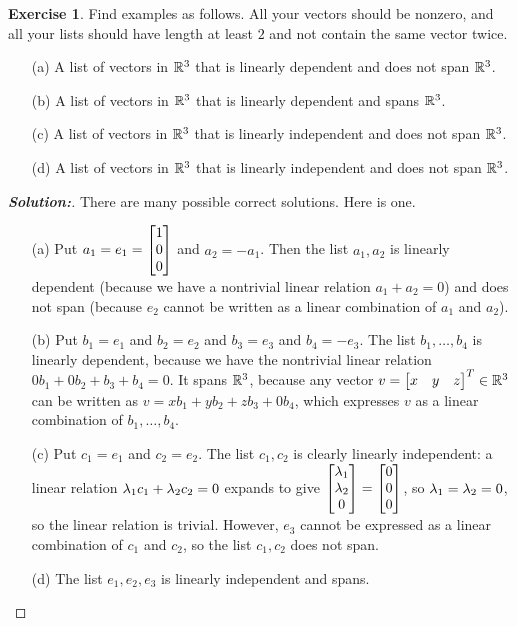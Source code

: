 \documentclass[a4paper]{amsart}
\theoremstyle{definition}
\newtheorem{exercise}{Exercise}
\newenvironment{solution}{\begin{proof}[\textbf{Solution:}] \vphantom{u}}{\end{proof}}
\begin{document}
\begin{exercise}\label{ex-independent-iii}
 Find examples as follows.  All your vectors should be nonzero, and
 all your lists should have length at least $2$ and not contain the
 same vector twice.
 \begin{itemize}
  \item[(a)] A list of vectors in ${\mathbb{R}}^3$ that is linearly dependent
   and does not span ${\mathbb{R}}^3$.
  \item[(b)] A list of vectors in ${\mathbb{R}}^3$ that is linearly dependent
   and spans ${\mathbb{R}}^3$.
  \item[(c)] A list of vectors in ${\mathbb{R}}^3$ that is linearly independent
   and does not span ${\mathbb{R}}^3$.
  \item[(d)] A list of vectors in ${\mathbb{R}}^3$ that is linearly independent
   and does not span ${\mathbb{R}}^3$.
 \end{itemize}
\end{exercise}
\begin{solution}
 There are many possible correct solutions.  Here is one.
 \begin{itemize}
  \item[(a)] Put $a_1=e_1=\left[\begin{matrix} 1\\0\\0\end{matrix}\right]$ and $a_2=-a_1$.  Then the
   list $a_1,a_2$ is linearly dependent (because we have a nontrivial
   linear relation $a_1+a_2=0$) and does not span (because $e_2$
   cannot be written as a linear combination of $a_1$ and $a_2$).
  \item[(b)] Put $b_1=e_1$ and $b_2=e_2$ and $b_3=e_3$ and
   $b_4=-e_3$.  The list $b_1,\dotsc,b_4$ is linearly dependent,
   because we have the nontrivial linear relation
   $0b_1+0b_2+b_3+b_4=0$.  It spans ${\mathbb{R}}^3$, because any vector
   $v=\left[\begin{matrix} x&y&z\end{matrix}\right]^T\in{\mathbb{R}}^3$ can be written as
   $v=xb_1+yb_2+zb_3+0b_4$, which expresses $v$ as a linear
   combination of $b_1,\dotsc,b_4$.
  \item[(c)] Put $c_1=e_1$ and $c_2=e_2$.  The list $c_1,c_2$ is
   clearly linearly independent: a linear relation
   $\lambda_1c_1+\lambda_2c_2=0$ expands to give
   $\left[\begin{matrix} \lambda_1\\\lambda_2\\0\end{matrix}\right]=\left[\begin{matrix} 0\\0\\0\end{matrix}\right]$, so $\lambda_1=\lambda_2=0$, so
   the linear relation is trivial.  However, $e_3$ cannot be expressed
   as a linear combination of $c_1$ and $c_2$, so the list $c_1,c_2$
   does not span.
  \item[(d)] The list $e_1,e_2,e_3$ is linearly independent and spans.
 \end{itemize}
\end{solution}
\end{document}

